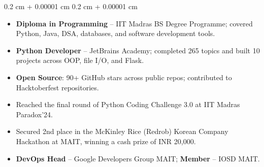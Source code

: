 \documentclass[10pt, letterpaper]{article}
\newenvironment{highlightsforbulletentries}{
    \begin{itemize}[
        topsep=0.02 cm,
        parsep=0.02 cm,
        partopsep=0pt,
        itemsep=0pt,
        leftmargin=10pt
    ]
}{
    \end{itemize}
} %
\newenvironment{onecolentry}{
    \begin{adjustwidth}{
        0.2 cm + 0.00001 cm
    }{
        0.2 cm + 0.00001 cm
    }
}{
    \end{adjustwidth}
} %
\begin{document}
        \begin{onecolentry}
            \begin{highlightsforbulletentries}
                \item \textbf{Diploma in Programming} -- IIT Madras BS Degree Programme; covered Python, Java, DSA, databases, and software development tools.
                \item \textbf{Python Developer} -- JetBrains Academy; completed 265 topics and built 10 projects across OOP, file I/O, and Flask.
                \item \textbf{Open Source}: 90+ GitHub stars across public repos; contributed to Hacktoberfest repositories.
                \item Reached the final round of Python Coding Challenge 3.0 at IIT Madras Paradox'24.
                \item Secured 2nd place in the McKinley Rice (Redrob) Korean Company Hackathon at MAIT, winning a cash prize of INR 20,000.
                \item \textbf{DevOps Head} -- Google Developers Group MAIT; \textbf{Member} -- IOSD MAIT.
            \end{highlightsforbulletentries}
        \end{onecolentry}
\end{document}

